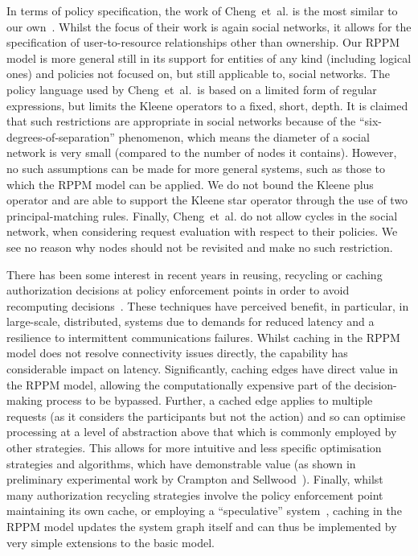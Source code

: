 \documentclass{article}
\begin{document}
In terms of policy specification, the work of Cheng~et~al. is the most similar to our own~\cite{ChengPS12passat,ChengPS12dbsec}.
Whilst the focus of their work is again social networks, it allows for the specification of user-to-resource relationships other than ownership.
Our RPPM model is more general still in its support for entities of any kind (including logical ones) and policies not focused on, but still applicable to, social networks.
The policy language used by Cheng~et~al.~is based on a limited form of regular expressions, but limits the Kleene operators to a fixed, short, depth.
It is claimed that such restrictions are appropriate in social networks because of the ``six-degrees-of-separation'' phenomenon, which means the diameter of a social network is very small (compared to the number of nodes it contains).
However, no such assumptions can be made for more general systems, such as those to which the RPPM model can be applied.
We do not bound the Kleene plus operator and are able to support the Kleene star operator through the use of two principal-matching rules.
Finally, Cheng~et~al. do not allow cycles in the social network, when considering request evaluation with respect to their policies.
We see no reason why nodes should not be revisited and make no such restriction.

There has been some interest in recent years in reusing, recycling or caching authorization decisions at policy enforcement points in order to avoid recomputing decisions~\cite{BordersZP05,KohlerBS09,KohlerF09,WeiCB11}.
These techniques have perceived benefit, in particular, in large-scale, distributed, systems due to demands for reduced latency and a resilience to intermittent communications failures.
Whilst caching in the RPPM model does not resolve connectivity issues directly, the capability has considerable impact on latency.
Significantly, caching edges have direct value in the RPPM model, allowing the computationally expensive part of the decision-making process to be bypassed.
Further, a cached edge applies to multiple requests (as it considers the participants but not the action) and so can optimise processing at a level of abstraction above that which is commonly employed by other strategies.
This allows for more intuitive and less specific optimisation strategies and algorithms, which have demonstrable value (as shown in preliminary experimental work by Crampton and Sellwood~\cite{CramptonS14}).
Finally, whilst many authorization recycling strategies involve the policy enforcement point maintaining its own cache, or employing a ``speculative'' system~\cite{KiniB13}, caching in the RPPM model updates the system graph itself and can thus be implemented by very simple extensions to the basic model.
\end{document}
